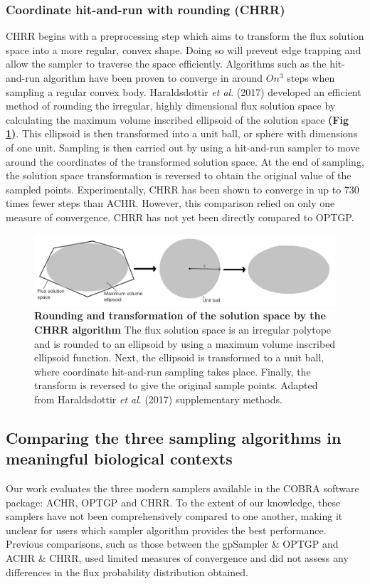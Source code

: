 \documentclass[10pt,letterpaper]{article}
\begin{document}
\subsubsection*{Coordinate hit-and-run with rounding (CHRR)}
CHRR begins with a preprocessing step which aims to transform the flux solution space into a more regular, convex shape\cite{Haraldsdottir}. Doing so will prevent edge trapping and allow the sampler to traverse the space efficiently. Algorithms such as the hit-and-run algorithm have been proven to converge in around $On^{3}$ steps when sampling a regular convex body\cite{Lovasz}. Haraldsdottir \textit{et al}. (2017) developed an efficient method of rounding the irregular, highly dimensional flux solution space by calculating the maximum volume inscribed ellipsoid of the solution space \textbf{(Fig \ref{figure:2})}\cite{Haraldsdottir}. This ellipsoid is then transformed into a unit ball, or sphere with dimensions of one unit. Sampling is then carried out by using a hit-and-run sampler to move around the coordinates of the transformed solution space. At the end of sampling, the solution space transformation is reversed to obtain the original value of the sampled points\cite{Haraldsdottir}. Experimentally, CHRR has been shown to converge in up to 730 times fewer steps than ACHR\cite{Haraldsdottir}. However, this comparison relied on only one measure of convergence. CHRR has not yet been directly compared to OPTGP.

\begin{figure}
	\includegraphics[scale=1.2]{fig2.png}
	\caption{\textbf{Rounding and transformation of the solution space by the CHRR algorithm}
The flux solution space is an irregular polytope and is rounded to an ellipsoid by using a maximum volume inscribed ellipsoid function. Next, the ellipsoid is transformed to a unit ball, where coordinate hit-and-run sampling takes place. Finally, the transform is reversed to give the original sample points. Adapted from Haraldsdottir \textit{et al}. (2017) supplementary methods\cite{Haraldsdottir}.
}
\label{figure:2}
\end{figure}

\pagebreak
\subsection*{Comparing the three sampling algorithms in meaningful biological contexts}
Our work evaluates the three modern samplers available in the COBRA software package: ACHR, OPTGP and CHRR. To the extent of our knowledge, these samplers have not been comprehensively compared to one another, making it unclear for users which sampler algorithm provides the best performance. Previous comparisons, such as those between the gpSampler {\&} OPTGP\cite{Megchelenbrink} and ACHR {\&} CHRR\cite{Haraldsdottir}, used limited measures of convergence and did not assess any differences in the flux probability distribution obtained. 
\end{document}
